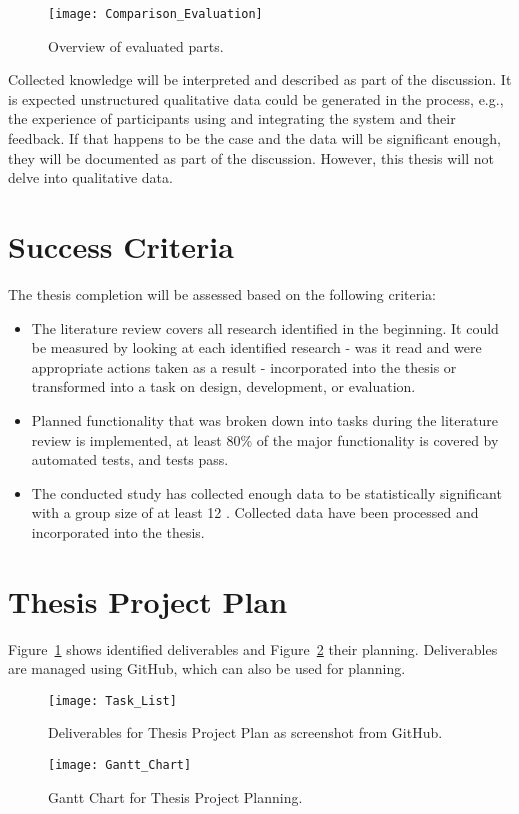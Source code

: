 \documentclass[a4paper,12pt]{report}
\begin{document}
\begin{figure}[h!]
    \centering
    \texttt{[image: Comparison\_Evaluation]}
    \caption{Overview of evaluated parts.}
\end{figure}

Collected knowledge will be interpreted and described as part of the discussion.
It is expected unstructured qualitative data could be generated in the process, e.g., the experience of participants using and integrating the system and their feedback.
If that happens to be the case and the data will be significant enough, they will be documented as part of the discussion. However, this thesis will not delve into qualitative data.

\section{Success Criteria}

The thesis completion will be assessed based on the following criteria:

\begin{itemize}
    \item The literature review covers all research identified in the beginning.
    It could be measured by looking at each identified research - was it read and were appropriate actions taken as a result - incorporated into the thesis or transformed into a task on design, development, or evaluation.
    \item Planned functionality that was broken down into tasks during the literature review is implemented, at least 80\% of the major functionality is covered by automated tests, and tests pass.
    \item The conducted study has collected enough data to be statistically significant with a group size of at least 12 \parencite{macefield2009specify}. Collected data have been processed and incorporated into the thesis.
\end{itemize}

\section{Thesis Project Plan}

Figure~\ref{fig:tasklist} shows identified deliverables and Figure~\ref{fig:ganttchart} their planning. Deliverables are managed using GitHub, which can also be used for planning.

\begin{figure}[h!]
    \centering
    \texttt{[image: Task\_List]}
    \caption{Deliverables for Thesis Project Plan as screenshot from GitHub.}
    \label{fig:tasklist}
\end{figure}

\begin{figure}[h]
    \centering
    \texttt{[image: Gantt\_Chart]}
    \caption{Gantt Chart for Thesis Project Planning.}
    \label{fig:ganttchart}
\end{figure}

\cleardoublepage

\printbibliography[heading=subbibintoc]
\end{document}

